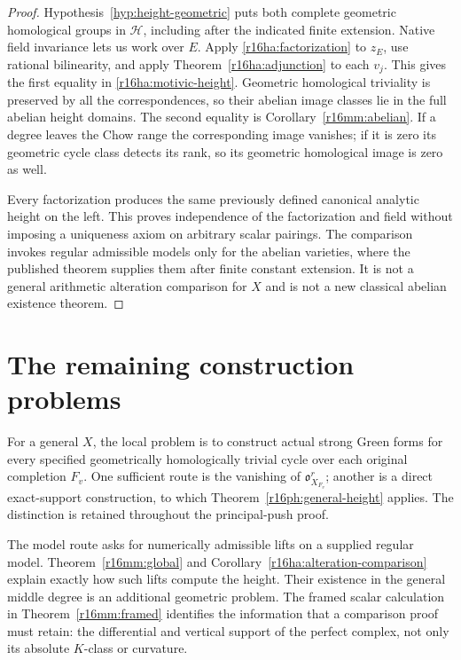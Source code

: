 \documentclass[11pt,a4paper]{article}
\theoremstyle{definition}
\theoremstyle{remark}
\numberwithin{equation}{section}
\begin{document}
\begin{proof}
Hypothesis~\ref{hyp:height-geometric} puts both complete geometric
homological groups in $\mathcal H$, including after the indicated
finite extension. Native field invariance lets us work over $E$.
Apply \eqref{r16ha:factorization} to $z_E$, use rational
bilinearity, and apply Theorem~\ref{r16ha:adjunction} to each
$v_j$. This gives the first equality in
\eqref{r16ha:motivic-height}. Geometric homological triviality
is preserved by all the correspondences, so their abelian
image classes lie in the full abelian height domains.
The second equality is Corollary~\ref{r16mm:abelian}.
If a degree leaves the Chow range the corresponding image
vanishes; if it is zero its geometric cycle class detects its
rank, so its geometric homological image is zero as well.

Every factorization produces the same previously defined
canonical analytic height on the left. This proves independence
of the factorization and field without imposing a uniqueness
axiom on arbitrary scalar pairings. The comparison invokes
regular admissible models only for the abelian varieties,
where the published theorem supplies them after finite constant
extension. It is not a general arithmetic alteration comparison
for $X$ and is not a new classical abelian existence theorem.
\end{proof}




\section{The remaining construction problems}\label{sec:height-remaining}

For a general $X$, the local problem is to construct actual strong Green forms for every specified geometrically homologically trivial cycle over each original completion $F_v$. One sufficient route is the vanishing of $\mathfrak o_{X_{F_v}}^r$; another is a direct exact-support construction, to which Theorem~\ref{r16ph:general-height} applies. The distinction is retained throughout the principal-push proof.

The model route asks for numerically admissible lifts on a supplied regular model. Theorem~\ref{r16mm:global} and Corollary~\ref{r16ha:alteration-comparison} explain exactly how such lifts compute the height. Their existence in the general middle degree is an additional geometric problem. The framed scalar calculation in Theorem~\ref{r16mm:framed} identifies the information that a comparison proof must retain: the differential and vertical support of the perfect complex, not only its absolute $K$-class or curvature.
\end{document}
